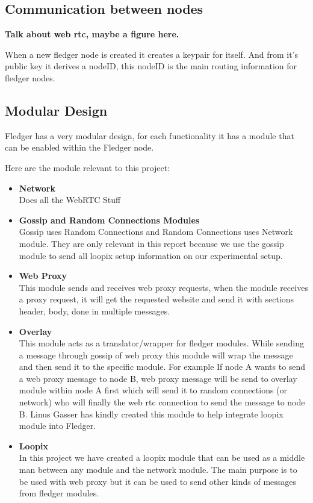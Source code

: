 \documentclass[a4paper,11pt,oneside]{report}
\begin{document}
\subsection{Communication between nodes}

\textbf{Talk about web rtc, maybe a figure here.}

When a new fledger node is created it creates a keypair for itself. And from it's public key it derives a nodeID, this nodeID is the main routing information for fledger nodes.

\subsection{Modular Design}

Fledger has a very modular design, for each functionality it has a module that can be enabled within the Fledger node.

Here are the module relevant to this project:
\begin{itemize}
    \item \textbf{Network} \\
    Does all the WebRTC Stuff    
    \item \textbf{Gossip and Random Connections Modules} \\
    Gossip uses Random Connections and Random Connections uses Network module. They are only relevant in this report because we use the gossip module to send all loopix setup information on our experimental setup.
    \item \textbf{Web Proxy} \\
    This module sends and receives web proxy requests, when the module receives a proxy request, it will get the requested website and send it with sections header, body, done in multiple messages.
    \item \textbf{Overlay} \\
    This module acts as a translator/wrapper for fledger modules. While sending a message through gossip of web proxy this module will wrap the message and then send it to the specific module. For example If node A wants to send a web proxy message to node B, web proxy message will be send to overlay module within node A first which will send it to random connections (or network) who will finally the web rtc connection to send the message to node B. Linus Gasser has kindly created this module to help integrate loopix module into Fledger.
    \item \textbf{Loopix} \\
    In this project we have created a loopix module that can be used as a middle man between any module and the network module. The main purpose is to be used with web proxy but it can be used to send other kinds of messages from fledger modules.
\end{itemize}
\end{document}
